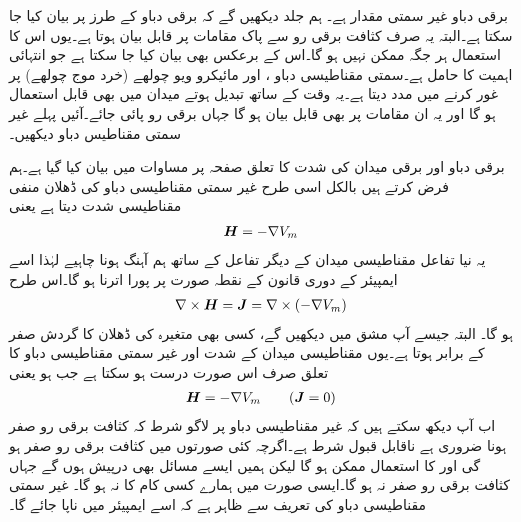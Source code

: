 برقی دباو غیر سمتی مقدار ہے۔ ہم جلد دیکھیں گے کہ برقی دباو کے طرز پر  بیان کیا جا سکتا ہے۔البتہ یہ صرف کثافت برقی رو سے پاک مقامات پر قابل بیان ہوتا ہے۔یوں اس کا استعمال ہر جگہ ممکن نہیں ہو گا۔اس کے برعکس  بھی بیان کیا جا سکتا ہے جو انتہائی اہمیت کا حامل ہے۔سمتی مقناطیسی دباو ،  اور مائیکرو ویو چولھے (خرد موج چولھے) پر غور کرنے میں مدد دیتا ہے۔یہ وقت کے ساتھ تبدیل ہوتے میدان میں بھی قابل استعمال ہو گا اور یہ ان مقامات پر بھی قابل بیان ہو گا جہاں برقی رو پائی جائے۔آئیں پہلے غیر سمتی مقناطیس دباو دیکھیں۔

برقی دباو اور برقی میدان کی شدت کا تعلق صفحہ  پر مساوات  میں بیان کیا گیا ہے۔ہم فرض کرتے ہیں  بالکل اسی طرح غیر سمتی مقناطیسی دباو  کی ڈھلان منفی مقناطیسی شدت دیتا ہے یعنی
\begin{align*}
{\ensuremath{{\boldsymbol{H}}}}=-\nabla V_m
\end{align*}
یہ نیا تفاعل مقناطیسی میدان کے دیگر تفاعل کے ساتھ ہم آہنگ ہونا چاہیے لہٰذا اسے ایمپیئر کے دوری قانون کے نقطہ صورت پر پورا اترنا ہو گا۔اس طرح
\begin{align}
\nabla \times {\ensuremath{{\boldsymbol{H}}}}={{\boldsymbol{J}}}=\nabla \times \left(-\nabla V_m\right) 
\end{align}
ہو گا۔ البتہ جیسے آپ مشق  میں دیکھیں گے، کسی بھی متغیرہ کی ڈھلان کا گردش صفر کے برابر ہوتا ہے۔یوں مقناطیسی میدان کے شدت اور غیر سمتی مقناطیسی دباو کا تعلق صرف اس صورت درست ہو سکتا ہے جب  ہو یعنی
\begin{align}\label{مساوات_مقناطیسی_شدت_غیر_سمتی_دباو}
{\ensuremath{{\boldsymbol{H}}}}=-\nabla V_m \quad \quad ({{\boldsymbol{J}}}=0)
\end{align}
اب آپ دیکھ سکتے ہیں کہ غیر مقناطیسی دباو پر لاگو شرط کہ کثافت برقی رو صفر ہونا ضروری ہے ناقابل قبول شرط ہے۔اگرچہ کئی صورتوں میں کثافت برقی رو صفر ہو گی اور  کا استعمال ممکن ہو گا لیکن ہمیں ایسے مسائل بھی درپیش ہوں  گے جہاں کثافت برقی رو صفر نہ ہو گا۔ایسی صورت میں  ہمارے کسی کام کا نہ ہو گا۔ غیر سمتی مقناطیسی دباو  کی تعریف سے ظاہر ہے کہ اسے ایمپیئر میں ناپا جائے گا۔

